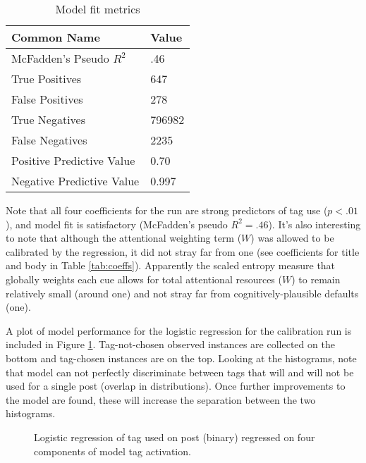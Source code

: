\documentclass[10pt,letterpaper]{article}
\begin{document}
\renewcommand{\arraystretch}{1}%
\renewcommand{\tabcolsep}{3mm}
\begin{table}[!ht]
  \begin{center} 
    \caption{Model fit metrics} 
    \label{tab:fits} 
    \vskip 0.12in
    \begin{tabular}{ll} 
      \hline
      Common Name &  Value	\\
      \hline
      McFadden's Pseudo $R_{}^{2}$ &	.46 \\
      True Positives &			647 \\
      False Positives &			278 \\
      True Negatives &			\num{796982} \\
      False Negatives &			\num{2235} \\
      Positive Predictive Value &	0.70 \\
      Negative Predictive Value &	0.997 \\
      \hline
    \end{tabular} 
  \end{center} 
\end{table}

Note that all four coefficients for the run are strong predictors of tag use ($p<.01$), and model fit is satisfactory (McFadden's pseudo $R_{}^{2}=.46$).
It's also interesting to note that although the attentional weighting term ($W$) was allowed to be calibrated by the regression, it did not stray far from one
(see coefficients for title and body in Table \ref{tab:coeffs}).
Apparently the scaled entropy measure that globally weights each cue allows for total attentional resources ($W$) to remain relatively small (around one) and not stray far from cognitively-plausible defaults (one).

A plot of model performance for the logistic regression for the calibration run is included in Figure \ref{fig:logReg}.
Tag-not-chosen observed instances are collected on the bottom and tag-chosen instances are on the top.
Looking at the histograms, note that model can not perfectly discriminate between tags that will and will not be used for a single post (overlap in distributions).
Once further improvements to the model are found, these will increase the separation between the two histograms.

\begin{figure}[ht]
  \centering
  \caption{
    Logistic regression of tag used on post (binary) regressed on four components of model tag activation.
  }
  \label{fig:logReg}
\end{figure}
\end{document}
